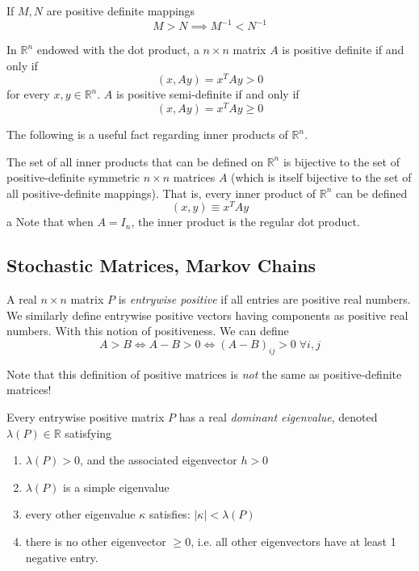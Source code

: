 \documentclass{article}
\begin{document}
    \begin{theorem}
    If $M, N$ are positive definite mappings 
    \[ M > N \implies M^{-1} < N^{-1}\]
    \end{theorem}

    \begin{proposition}
    In $\mathbb{R}^n$ endowed with the dot product, a $n \times n$ matrix $A$ is positive definite if and only if 
    \[(x, A y) = x^T A y > 0 \]
    for every $x, y \in \mathbb{R}^n$. $A$ is positive semi-definite if and only if 
    \[(x, A y) = x^T A y \geq 0\]
    \end{proposition}

    The following is a useful fact regarding inner products of $\mathbb{R}^n$. 
    \begin{proposition}
    The set of all inner products that can be defined on $\mathbb{R}^n$ is bijective to the set of positive-definite symmetric $n \times n$ matrices $A$ (which is itself bijective to the set of all positive-definite mappings). That is, every inner product of $\mathbb{R}^n$ can be defined 
    \[(x, y) \equiv x^T A y\]a
    Note that when $A = I_n$, the inner product is the regular dot product.
    \end{proposition}

  \subsection{Stochastic Matrices, Markov Chains}

    \begin{definition}
    A real $n \times n$ matrix $P$ is \textit{entrywise positive} if all entries are positive real numbers. We similarly define entrywise positive vectors having components as positive real numbers. With this notion of positiveness. We can define
    \[A > B \iff A - B > 0 \iff (A-B)_{i j} > 0 \; \forall i, j\]
    \end{definition}

    Note that this definition of positive matrices is \textit{not} the same as positive-definite matrices! 

    \begin{theorem}
    Every entrywise positive matrix $P$ has a real \textit{dominant eigenvalue}, denoted $\lambda(P) \in \mathbb{R}$ satisfying
    \begin{enumerate}
        \item $\lambda(P) > 0$, and the associated eigenvector $h >0$
        \item $\lambda(P)$ is a simple eigenvalue
        \item every other eigenvalue $\kappa$ satisfies: $|\kappa| < \lambda(P)$
        \item there is no other eigenvector $\geq 0$, i.e. all other eigenvectors have at least 1 negative entry.
    \end{enumerate}
    \end{theorem}
\end{document}
